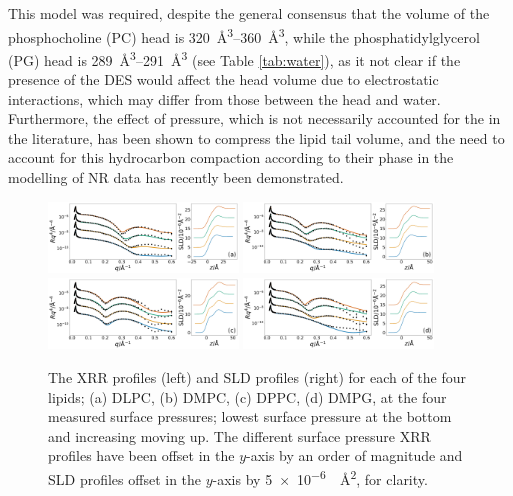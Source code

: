\documentclass[%
 reprint,
 amsmath,amssymb,
 prl,
]{revtex4-1}
\begin{document}
This model was required, despite the general consensus that the volume of the phosphocholine (PC) head is \SIrange{320}{360}{\cubic\angstrom}, while the phosphatidylglycerol (PG) head is \SIrange{289}{291}{\cubic\angstrom} (see Table \ref{tab:water}), as it not clear if the presence of the DES would affect the head volume due to electrostatic interactions, which may differ from those between the head and water.
Furthermore, the effect of pressure, which is not necessarily accounted for the in the literature, has been shown to compress the lipid tail volume\cite{Marsh2010,Small1984}, and the need to account for this hydrocarbon compaction according to their phase in the modelling of NR data has recently been demonstrated\cite{Campbell2018}.
%
\begin{figure}
	\centering
	\includegraphics[width=0.45\textwidth]{figures/dlpc_ref_sld}
	\includegraphics[width=0.45\textwidth]{figures/dmpc_ref_sld}
	\includegraphics[width=0.45\textwidth]{figures/dppc_ref_sld}
	\includegraphics[width=0.45\textwidth]{figures/dmpg_ref_sld}
	\caption{The XRR profiles (left) and SLD profiles (right) for each of the four lipids; (a) DLPC, (b) DMPC, (c) DPPC, (d) DMPG, at the four measured surface pressures; lowest surface pressure at the bottom and increasing moving up. The different surface pressure XRR profiles have been offset in the $y$-axis by an order of magnitude and SLD profiles offset in the $y$-axis by \SI{5e-6}{\per\square\angstrom}, for clarity.}
	\label{fig:lipids}
\end{figure}
%
\end{document}
